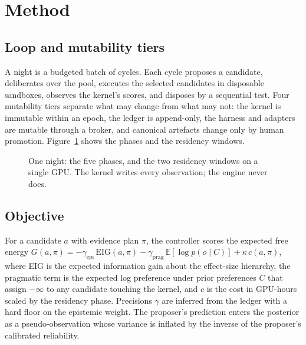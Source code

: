 \section{Method}
\label{sec:method}

\subsection{Loop and mutability tiers}
A night is a budgeted batch of cycles. Each cycle proposes a candidate, deliberates over the pool, executes the selected candidates in disposable sandboxes, observes the kernel's scores, and disposes by a sequential test. Four mutability tiers separate what may change from what may not: the kernel is immutable within an epoch, the ledger is append-only, the harness and adapters are mutable through a broker, and canonical artefacts change only by human promotion. Figure~\ref{fig:loop} shows the phases and the residency windows.

\begin{figure}[t]
\centering
{}
\caption{One night: the five phases, and the two residency windows on a single GPU. The kernel writes every observation; the engine never does.}
\label{fig:loop}
\end{figure}

\subsection{Objective}
For a candidate $a$ with evidence plan $\pi$, the controller scores the expected free energy $G(a,\pi) = -\gamma_{\mathrm{epi}}\,\mathrm{EIG}(a,\pi) - \gamma_{\mathrm{prag}}\,\mathbb{E}[\log p(o \mid C)] + \kappa\, c(a,\pi)$, where EIG is the expected information gain about the effect-size hierarchy, the pragmatic term is the expected log preference under prior preferences $C$ that assign $-\infty$ to any candidate touching the kernel, and $c$ is the cost in GPU-hours scaled by the residency phase. Precisions $\gamma$ are inferred from the ledger with a hard floor on the epistemic weight. The proposer's prediction enters the posterior as a pseudo-observation whose variance is inflated by the inverse of the proposer's calibrated reliability.

